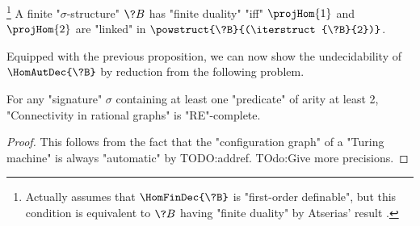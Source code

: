 
\begin{proposition}%
	\!\footnote{Actually \cite[Theorem 4.7]{LaroseLotenTardif2007CharacterisationFOCSP} assumes
	that $\HomFinDec{\?B}$ is "first-order definable", but this condition
	is equivalent to $\?B$ having "finite duality" by Atserias' result
	\cite[Corollary 4]{Atserias2008DigraphColoring}.}%
	\AP\label{prop:characterization-finite-duality-path-projections}
	A finite "$\sigma$-structure" $\?B$ has "finite duality" "iff"
	$\projHom{1}$ and $\projHom{2}$ are "linked" in $\powstruct{\?B}{(\iterstruct{\?B}{2})}$.
\end{proposition}

Equipped with the previous proposition, we can now show the undecidability 
of $\HomAutDec{\?B}$ by reduction from the following problem.

\begin{property}
	\AP\label{prop:undecidability-connectivity}
	For any "signature" $\sigma$ containing at least one "predicate" of
	arity at least 2, "Connectivity in rational graphs" is "RE"-complete.
\end{property}

\begin{proof}
	This follows from the fact that the "configuration graph" of
	a "Turing machine" is always "automatic" by TODO:addref.
	TOdo:Give more precisions.
\end{proof}

